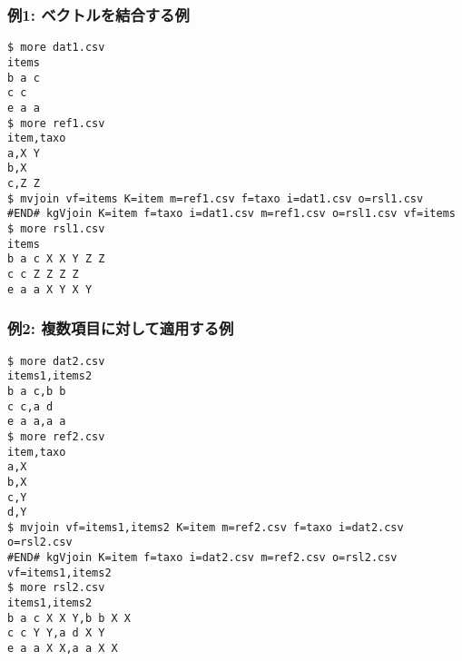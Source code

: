 \subsubsection*{例1: ベクトルを結合する例}



\begin{Verbatim}[baselinestretch=0.7,frame=single]
$ more dat1.csv
items
b a c
c c
e a a
$ more ref1.csv
item,taxo
a,X Y
b,X
c,Z Z
$ mvjoin vf=items K=item m=ref1.csv f=taxo i=dat1.csv o=rsl1.csv
#END# kgVjoin K=item f=taxo i=dat1.csv m=ref1.csv o=rsl1.csv vf=items
$ more rsl1.csv
items
b a c X X Y Z Z
c c Z Z Z Z
e a a X Y X Y
\end{Verbatim}
\subsubsection*{例2: 複数項目に対して適用する例}



\begin{Verbatim}[baselinestretch=0.7,frame=single]
$ more dat2.csv
items1,items2
b a c,b b
c c,a d
e a a,a a
$ more ref2.csv
item,taxo
a,X
b,X
c,Y
d,Y
$ mvjoin vf=items1,items2 K=item m=ref2.csv f=taxo i=dat2.csv o=rsl2.csv
#END# kgVjoin K=item f=taxo i=dat2.csv m=ref2.csv o=rsl2.csv vf=items1,items2
$ more rsl2.csv
items1,items2
b a c X X Y,b b X X
c c Y Y,a d X Y
e a a X X,a a X X
\end{Verbatim}
